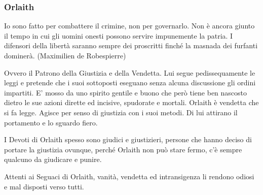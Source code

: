 \begin{multicols}{2}
\subsubsection{Orlaith}\label{orlaith}\hypertarget{orlaith}{}

\begin{changemargin}{0.3cm}{0.3cm}\begin{enfasi}{
Io sono fatto per combattere il crimine, non per governarlo. Non è ancora giunto il tempo in cui gli uomini onesti possono servire impunemente la patria. I difensori della libertà saranno sempre dei proscritti finché la masnada dei furfanti dominerà. (Maximilien de Robespierre)
}\end{enfasi}\end{changemargin}\medskip

Ovvero il Patrono della Giustizia e della Vendetta. Lui segue pedissequamente le leggi e pretende che i suoi sottoposti eseguano senza alcuna discussione gli ordini impartiti. E' mosso da uno spirito gentile e buono che però tiene ben nascosto dietro le sue azioni dirette ed incisive, spudorate e mortali. Orlaith è vendetta che si fa legge. Agisce per senso di giustizia con i suoi metodi. Di lui attirano il portamento e lo sguardo fiero.

I Devoti di Orlaith spesso sono giudici e giustizieri, persone che hanno deciso di portare la giustizia ovunque, perché Orlaith non può stare fermo, c'è sempre qualcuno da giudicare e punire.

Attenti ai Seguaci di Orlaith, vanità, vendetta ed intransigenza li rendono odiosi e mal disposti verso tutti.




\end{multicols}
